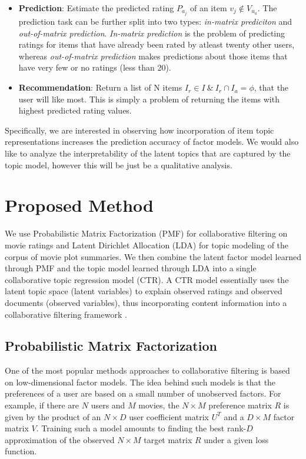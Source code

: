\documentclass{article} %
\begin{document}
\begin{itemize}[leftmargin=*]

\item[] {\bf Prediction}: Estimate the predicted rating $P_{a_{j}}$ of an
item $v_{j} \notin V_{u_{a}}$. The prediction task can be further split into
two types: \textit{in-matrix prediciton} and \textit{out-of-matrix prediction}. 
\textit{In-matrix prediction} is the problem of predicting ratings for items
that have already been rated by atleast twenty other users, whereas 
\textit{out-of-matrix prediction} makes predictions about those items that have
very few or no ratings (less than 20).

\item[] {\bf Recommendation}: Return a list of N items $I_{r} \in I \:\&\: I_{r} \cap I_{a} = \phi$, that the user will like most. This is simply a problem of
returning the items with highest predicted rating values.

\end{itemize}

Specifically, we are interested in observing how incorporation of item topic 
representations increases the prediction accuracy of factor models. We would
also like to analyze the interpretability of the latent topics that are 
captured by the topic model, however this will be just be a qualitative 
analysis.

\section{Proposed Method}
\label{gen_inst}

We use Probabilistic Matrix Factorization (PMF) for collaborative filtering on 
movie ratings and Latent Dirichlet Allocation (LDA) for topic modeling of the 
corpus of movie plot summaries. We then combine the latent factor model learned
through PMF and the topic model learned through LDA into a single
collaborative topic regression model (CTR). A CTR model essentially uses the
latent topic space (latent variables) to explain observed ratings and observed 
documents (observed variables), thus incorporating content information into a 
collaborative filtering framework \cite{ctr}.

\subsection{Probabilistic Matrix Factorization}
\label{sec:pmf}

One of the most popular methods approaches to collaborative filtering is based
on low-dimensional factor models. The idea behind such models is that the preferences of a user are based on a small number of unobserved factors. For example, if there are $N$ users and $M$ movies, the $N \times M$ preference matrix $R$ is given by the product of an $N \times D$ user coefficient matrix $U^T$ and a $D \times M$ factor matrix $V$. Training such a model amounts to finding the best rank-$D$ approximation of the observed $N \times M$ target matrix $R$ under a given loss function.
\end{document}
